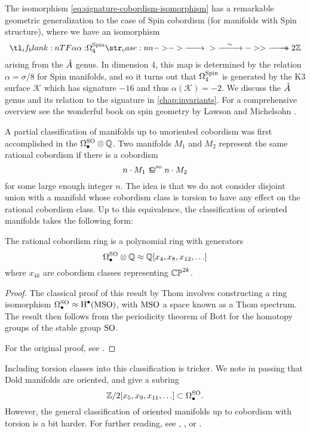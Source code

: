 \begin{remark}
\begin{remark}
	The isomorphism \cref{eq:signature-cobordism-isomorphism} has a remarkable geometric generalization to the case of Spin cobordism (for manifolds with Spin structure), where we have an isomorphism
	\[
		\lkxfunc{\alpha}{\Omega^\Spin_4}{2\Z}
	\]
	arising from the $\hat{A}$ genus. In dimension $4$, this map is determined by the relation $\alpha=\sigma/8$ for Spin manifolds, and so it turns out that $\Omega^{\mathrm{Spin}}_4$ is generated by the K3 surface $\mathcal{K}$ which has signature $-16$ and thus $\alpha(\mathcal{K})=-2$.
	We discuss the $\hat{A}$ genus and its relation to the signature in \cref{chap:invariants}. For a comprehensive overview see the wonderful book on spin geometry by Lawson and Michelsohn \cite{lawson1989spin}.
\end{remark}

A partial classification of manifolds up to unoriented cobordism was first accomplished in the  $\Omega_\bullet^{\mathrm{SO}}\otimes \mathbb{Q}$. Two manifolds $M_1$ and $M_2$ represent the same rational cobordism if there is a cobordism
\[
		n\cdot M_1 \sobord n\cdot M_2
\]
for some large enough integer $n$. The idea is that we do not consider disjoint union with a manifold whose cobordism class is torsion to have any effect on the rational cobordism class. Up to this equivalence, the classification of oriented manifolds takes the following form:

\begin{theorem}[Thom]\label{thm:oriented-cobordism-structure}
	The rational cobordism ring is a polynomial ring with generators
	\[
		\Omega_\bullet^{\mathrm{SO}}\otimes \mathbb{Q} \approx \mathbb{Q}[x_4, x_8, x_{12}, \ldots]
	\]
	where $x_{4k}$ are cobordism classes representing $\mathbb{CP}^{2k}$.
\end{theorem}
\begin{proof}
	The classical proof of this result by Thom involves constructing a ring isomorphism $\Omega_\bullet^{\mathrm{SO}} \approx \operatorname{H}^\bullet(\mathrm{MSO})$, with $\mathrm{MSO}$ a space known as a Thom spectrum. The result then follows from the periodicity theorem of Bott \cite{bott1959stable} for the homotopy groups of the stable group $\mathrm{SO}$.

	For the original proof, see \cite{thom1954}.
\end{proof}

Including torsion classes into this classification is tricker. We note in passing that Dold manifolds are oriented, and give a subring
\[
	\mathbb{Z}/2[x_5,x_9,x_{11},\ldots] \subset \Omega_\bullet^{\mathrm{SO}}.
\]
However, the general classification of oriented manifolds up to cobordism with torsion is a bit harder. For further reading, see \cite{strong1968cobordism}, \cite{hirzebruch1966methods}, or \cite{may1999concise}.


\end{remark}
